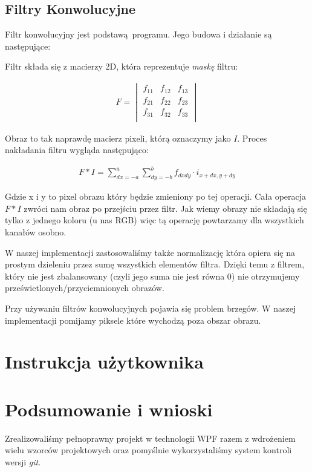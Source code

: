 \documentclass{article}
\begin{document}
\subsection{Filtry Konwolucyjne}
Filtr konwolucyjny jest podstawą programu. Jego budowa i działanie są następujące:

Filtr składa się z macierzy 2D, która reprezentuje \textit{maskę} filtru:

\begin{gather}
    F = 
       \begin{vmatrix}
        f_{11} & f_{12} & f_{13}\\
        f_{21} & f_{22} & f_{23}\\
        f_{31} & f_{32} & f_{33}\\
        \end{vmatrix}
\end{gather}

Obraz to tak naprawdę macierz pixeli, którą oznaczymy jako $I$.
Proces nakładania filtru wygląda następująco:

\begin{gather}
    F * I = \sum_{dx = -a}^{a} \sum_{dy = -b}^{b} f_{dxdy} \cdot i_{x+dx, y+dy}
\end{gather}

Gdzie x i y to pixel obrazu który będzie zmieniony po tej operacji. Cała operacja $F*I$ 
zwróci nam obraz po przejściu przez filtr. Jak wiemy obrazy nie składają się tylko 
z jednego koloru (u nas RGB) więc tą operację powtarzamy dla wszystkich kanałów osobno.

W naszej implementacji zastosowaliśmy także normalizację która opiera się na prostym dzieleniu
przez sumę wszystkich elementów filtra. Dzięki temu z filtrem, który nie jest zbalansowany (czyli jego suma
nie jest równa 0) nie otrzymujemy prześwietlonych/przyciemnionych obrazów.

Przy używaniu filtrów konwolucyjnych pojawia się problem brzegów. W naszej implementacji pomijamy
piksele które wychodzą poza obszar obrazu.









\section{Instrukcja użytkownika}
\section{Podsumowanie i wnioski}
Zrealizowaliśmy pełnoprawny projekt w technologii WPF razem z wdrożeniem wielu wzorców projektowych oraz pomyślnie
wykorzystaliśmy system kontroli wersji \textit{git}.
\end{document}
